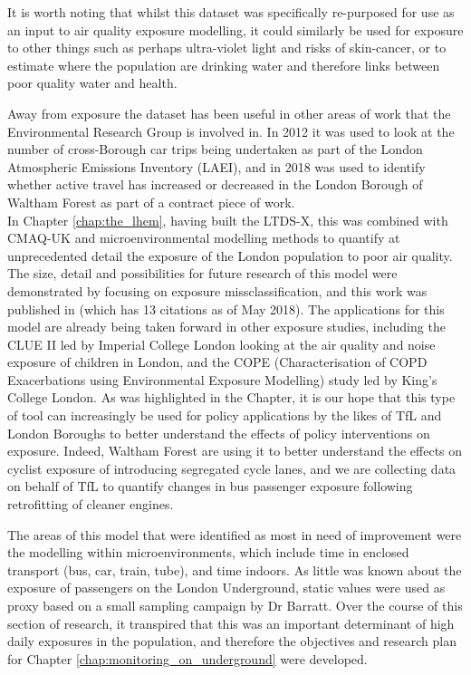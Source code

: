 It is worth noting that whilst this dataset was specifically re-purposed for use as an input to air quality exposure modelling, it could similarly be used for exposure to other things such as perhaps ultra-violet light and risks of skin-cancer, or to estimate where the population are drinking water and therefore links between poor quality water and health.

Away from exposure the dataset has been useful in other areas of work that the Environmental Research Group is involved in. In 2012 it was used to look at the number of cross-Borough car trips being undertaken as part of the London Atmospheric Emissions Inventory (LAEI), and in 2018 was used to identify whether active travel has increased or decreased in the London Borough of Waltham Forest as part of a contract piece of work.\\

In Chapter \ref{chap:the_lhem}, having built the LTDS-X, this was combined with CMAQ-UK and microenvironmental modelling methods to quantify at unprecedented detail the exposure of the London population to poor air quality. The size, detail and possibilities for future research of this model were demonstrated by focusing on exposure missclassification, and this work was published in \cite{Smith2016} (which has 13 citations as of May 2018). The applications for this model are already being taken forward in other exposure studies, including the CLUE II led by Imperial College London looking at the air quality and noise exposure of children in London, and the COPE (Characterisation of COPD Exacerbations using Environmental Exposure Modelling) study led by King's College London. As was highlighted in the Chapter, it is our hope that this type of tool can increasingly be used for policy applications by the likes of TfL and London Boroughs to better understand the effects of policy interventions on exposure. Indeed, Waltham Forest are using it to better understand the effects on cyclist exposure of introducing segregated cycle lanes, and we are collecting data on behalf of TfL to quantify changes in bus passenger exposure following retrofitting of cleaner engines.

The areas of this model that were identified as most in need of improvement were the modelling within microenvironments, which include time in enclosed transport (bus, car, train, tube), and time indoors. As little was known about the exposure of passengers on the London Underground, static values were used as proxy based on a small sampling campaign by Dr Barratt. Over the course of this section of research, it transpired that this was an important determinant of high daily exposures in the population, and therefore the objectives and research plan for Chapter \ref{chap:monitoring_on_underground} were developed.\\

